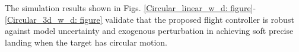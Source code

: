\documentclass[lettersize,journal]{IEEEtran}
\begin{document}
The simulation results shown in Figs. \ref{Circular_linear_w_d: figure}-\ref{Circular_3d_w_d: figure} validate that the proposed flight controller is robust against model uncertainty and exogenous perturbation in achieving soft precise landing when the target has circular motion.




\end{document}
